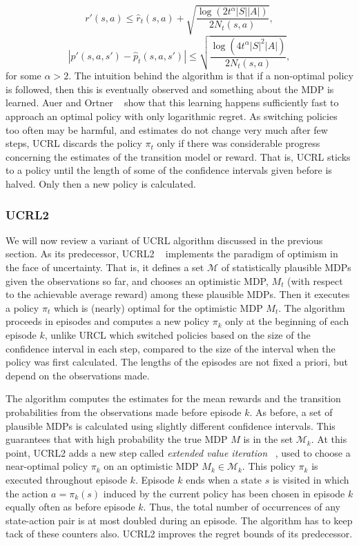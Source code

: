 \begin{equation}
		r'(s,a)\leq \hat{r}_t(s,a) +\sqrt{\frac{\log(2t^\alpha |S| |A|)}{2N_t(s,a)}},
\end{equation}
\begin{equation}
		|p'(s,a,s')- \hat{p}_t(s,a,s')| \leq \sqrt{\frac{\log(4t^\alpha |S|^2 |A|)}{2N_t(s,a)}},
\end{equation}
for some $\alpha>2$. The intuition behind the algorithm is that if a non-optimal policy is followed, then this is eventually observed and something about the MDP is learned. Auer and Ortner ~\cite{NIPS2006_3052} show that this learning happens sufficiently fast to approach an optimal policy with only logarithmic regret. As switching policies too often may be harmful, and estimates do not change very much after few steps, UCRL discards the policy $\pi_t$ only if there was considerable progress concerning the estimates of the transition model or reward. That is, UCRL sticks to a policy until the length of some of the confidence intervals given before is halved. Only then a new policy is calculated.

\subsubsection{UCRL2}
We will now review a variant of UCRL algorithm discussed in the previous section. As its predecessor, UCRL2 ~\cite{Jaksch:2010:NRB:1756006.1859902} implements the paradigm of optimism in the face of uncertainty. That is, it defines a set $\mathcal{M}$ of statistically plausible MDPs given the observations so far, and chooses an optimistic MDP, $M_t$ (with respect to the achievable average reward) among these plausible MDPs. Then it executes a policy $\pi_t$ which is (nearly) optimal for the optimistic MDP $M_t$. The algorithm proceeds in episodes and computes a new policy $\pi_k$ only at the beginning of each episode $k$, unlike URCL which switched policies based on the size of the confidence interval in each step, compared to the size of the interval when the policy was first calculated. The lengths of the episodes are not fixed a priori, but depend on the observations made.\par
The algorithm computes the estimates for the mean rewards and the transition probabilities from the observations made before episode $k$. As before, a set of plausible MDPs is calculated using slightly different confidence intervals. This guarantees that with high probability the true MDP $M$ is in the set $\mathcal{M}_k$. At this point, UCRL2 adds a new step called \emph{extended value iteration}~\cite{Jaksch:2010:NRB:1756006.1859902} , used to choose a near-optimal policy $\pi_k$ on an optimistic MDP $M_k \in \mathcal{M}_k$. This policy $\pi_k$ is executed throughout episode $k$. Episode $k$ ends when a state $s$ is visited in which the action $a =\pi_k(s)$ induced by the current policy has been chosen in episode $k$ equally often as before episode $k$. Thus, the total number of occurrences of any state-action pair is at most doubled during an episode. The algorithm has to keep tack of these counters also. UCRL2 improves the regret bounds of its predecessor. 
